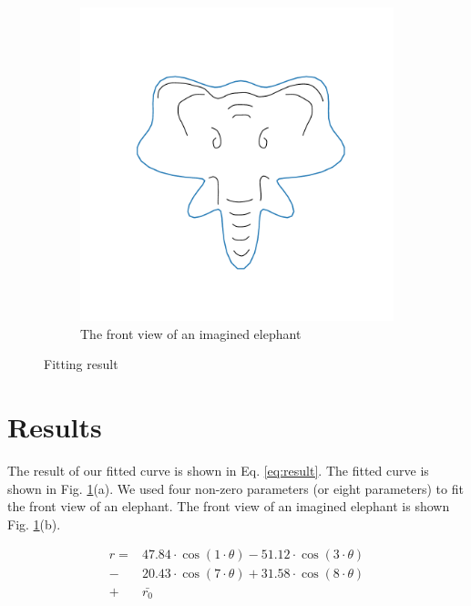 \documentclass{article}
\begin{document}
\begin{figure}[h]
\begin{subfigure}[b]{0.49\linewidth}
		\includegraphics[width=\linewidth]{real.pdf}
		\caption{The front view of an imagined elephant}
	\end{subfigure}
	\caption{Fitting result}
	\label{fig:result}
\end{figure}

\section{Results}

The result of our fitted curve is shown in Eq. \ref{eq:result}. The fitted curve is shown in Fig. \ref{fig:result}(a). We used four non-zero parameters (or eight parameters) to fit the front view of an elephant. The front view of an imagined elephant is shown  Fig. \ref{fig:result}(b). 




\begin{equation}
	\begin{aligned}
		r = & 47.84 \cdot \cos(1 \cdot \theta) 
		-51.12 \cdot \cos(3 \cdot \theta) \\
		-&20.43 \cdot \cos(7 \cdot \theta)
		+31.58 \cdot \cos(8 \cdot \theta) \\
		+& \bar{r_0}
	\end{aligned}
	\label{eq:result}
\end{equation}
\end{document}
